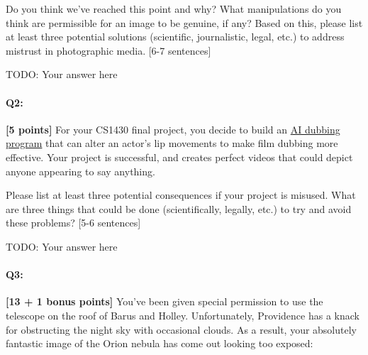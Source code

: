 \begin{tcolorbox}[colback=orange!5!white,colframe=orange!75!black]

Do you think we've reached this point and why? What manipulations do you think are permissible for an image to be genuine, if any? Based on this, please list at least three potential solutions (scientific, journalistic, legal, etc.) to address mistrust in photographic media. [6-7 sentences]
\end{tcolorbox}
\begin{mdframed}
    TODO: Your answer here
\end{mdframed}


\pagebreak
\paragraph{Q2:} \textbf{[5 points]} For your CS1430 final project, you decide to build an \href{https://respeecher.medium.com/what-is-synthetic-film-dubbing-ai-deepfake-technology-explained-9f6118532e8c}{AI dubbing program} that can alter an actor's lip movements to make film dubbing more effective. Your project is successful, and creates perfect videos that could depict anyone appearing to say anything.

\begin{tcolorbox}[colback=orange!5!white,colframe=orange!75!black]
Please list at least three potential consequences if your project is misused. What are three things that could be done (scientifically, legally, etc.) to try and avoid these problems? [5-6 sentences]
\end{tcolorbox}

\begin{mdframed}
        TODO: Your answer here
    \end{mdframed}

\pagebreak


\paragraph{Q3:} \textbf{[13 + 1 bonus points]} You've been given special permission to use the telescope on the roof of Barus and Holley. Unfortunately, Providence has a knack for obstructing the night sky with occasional clouds. As a result, your absolutely fantastic image of the Orion nebula has come out looking too exposed:

